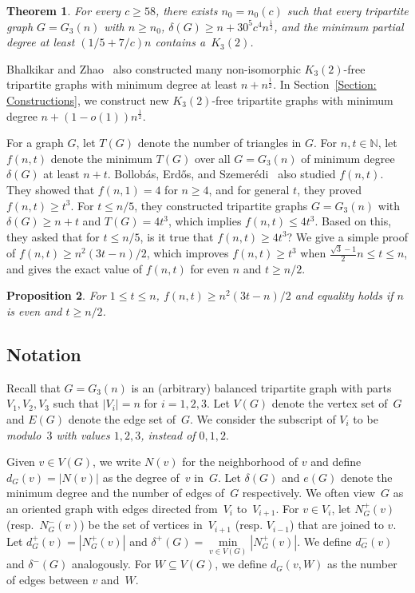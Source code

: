 \documentclass[11pt]{article}
\newtheorem{theorem}{Theorem}[section]
\newtheorem{proposition}[theorem]{Proposition}
\numberwithin{equation}{section}
\begin{document}
	\begin{theorem}\label{theorem: partial degree}
		For every $c \ge 58$, there exists $n_0 = n_0(c)$ such that every tripartite graph $G=G_3(n)$ with $n \ge n_0$, $\delta(G)\geq n+30^5 c^4 n^{\frac{1}{2}}$, and the minimum partial degree at least $(1/5 +  7/c)n$ contains a~$K_3(2)$. 
	\end{theorem}
	
	Bhalkikar and Zhao~\cite{bhalkikar2023subgraphs} also constructed many non-isomorphic $K_3(2)$-free tripartite graphs with minimum degree at least $n+n^{\frac{1}{2}}$. In Section~\ref{Section: Constructions}, we construct new $K_3(2)$-free tripartite graphs with minimum degree $n+(1-o(1))n^{\frac{1}{2}}$. %
	
	
	For a graph $G$, let $T(G)$ denote the number of triangles in $G$. For $n,t\in \mathbb{N}$, let $f(n,t)$ denote the minimum $T(G)$ over all $G=G_3(n)$ of minimum degree $\delta(G)$ at least $n+t$. Bollob\'{a}s, Erd\H{o}s, and Szemer\'{e}di~\cite{bollobas1975complete} also studied $f(n,t)$. They showed that $f(n,1)=4$ for $n\geq 4$, and for general $t$, they proved $f(n,t)\geq t^3$. For $t\leq n/5$, they constructed tripartite graphs $G=G_3(n)$ with $\delta(G)\geq n+t$ and $T(G)= 4t^3$, which implies $f(n,t)\leq 4t^3$. 
	Based on this, they asked that for $t\leq n/5$, is it true that $f(n,t)\geq 4t^3$? We give a simple proof of $f(n,t) \ge  n^2 (3t-n)/2$, which improves $f(n,t)\geq t^3$ when $\frac{\sqrt{3}-1}{2}n\leq t\leq n$, and gives the exact value of $f(n,t)$ for even $n$ and $t \ge n/2$. 	
	\begin{proposition}\label{2t^3 triangles}
		For $1 \le t \le n$, $f(n,t) \ge  n^2 (3t-n)/2$ and equality holds if $n$ is even and $t \ge n/2$. 
	\end{proposition}
	
	\subsection{Notation}
	Recall that $G=G_3(n)$ is an (arbitrary) balanced tripartite graph with parts $V_1,V_2,V_3$ such that $|V_i|=n$ for $i=1,2,3$. Let $V(G)$ denote the vertex set of~$G$ and $E(G)$ denote the edge set of~$G$. 
	We consider the subscript of $V_i$ to be \emph{modulo~$3$ with values $1, 2, 3$, instead of $0, 1, 2$}.

	Given $v \in V (G)$, we write $N(v)$ for the neighborhood of $v$ and define $d_G(v) = |N(v)|$ as the degree of~$v$ in~$G$. Let $\delta(G)$ and $e(G)$ denote the minimum degree and the number of edges of~$G$ respectively. 
	We often view~$G$ as an oriented graph with edges directed from~$V_i$ to~$V_{i+1}$.
	For $v \in V_i$, let $N_G^+(v)$ (resp.~$N_G^-(v)$) be the set of vertices in~$V_{i +1}$ (resp. $V_{i- 1}$) that are joined to $v$.  Let $d_G^+(v)=|N_G^+(v)|$ and $\delta^+(G)=\min\limits_{v\in V(G)}|N_G^+(v)|$.
	We define $d_G^-(v)$ and $\delta^-(G)$ analogously. 
	For $W \subseteq V (G)$, we define $d_G(v,W)$ as the number of edges between $v$ and~$W$. 
	
\end{document}
